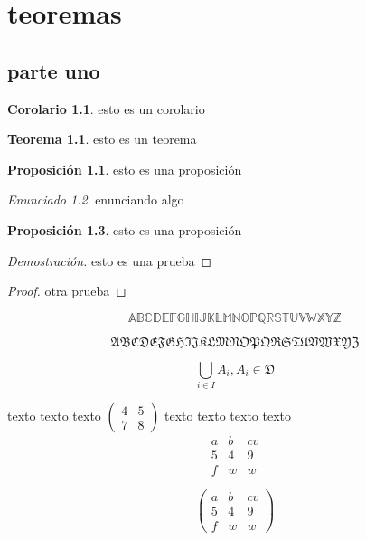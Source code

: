 \documentclass{report}
\numberwithin{equation}{section}
\theoremstyle{definition}
\newtheorem*{cor}{Corolario}
\newtheorem{teo}{Teorema}[section]
\newtheorem{prop}{Proposición}[chapter]
\theoremstyle{remark}
\newtheorem{enun}[prop]{Enunciado}
\begin{document}
\chapter{teoremas}
\section{parte uno}
	
\begin{cor}
	esto es un corolario
\end{cor}	

\begin{teo}
	esto es un teorema
\end{teo}
\begin{prop}
esto es una proposición	
\end{prop}
\begin{enun}
enunciando algo	
\end{enun}
\begin{prop}
	esto es una proposición	
\end{prop}	

\begin{proof}[Demostración]
	esto es una prueba
\end{proof}

\begin{proof}
	otra prueba
\end{proof}
	
	
$$
\mathbb{ABCDEFGHIJKLMNOPQRSTUVWXYZ}
$$	

$$
\mathfrak{ABCDEFGHIJKLMNOPQRSTUVWXYZ}
$$

$$
\bigcup_{i\in I}A_i, A_i\in\mathfrak{D}
$$
	
	
	
	
	
	
	
	
	
	
	
	
texto texto texto $(\begin{smallmatrix} 4 & 5 \\ 7 & 8 \end{smallmatrix})$ texto texto texto texto 	
$$
\begin{matrix}
a & b & cv \\
5 & 4 & 9 \\
f & w & w
\end{matrix}
$$

$$
\begin{pmatrix}
a & b & cv \\
5 & 4 & 9 \\
f & w & w
\end{pmatrix}
$$
\end{document}
